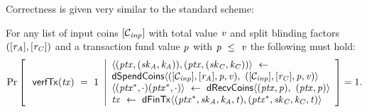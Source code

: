 Correctness is given very similar to the standard scheme:

\begin{definition}
    \label{def:ext-tx-scheme-correctness}
    For any list of input coins $[\mathcal{C}_{\mathit{inp}}]$ with total value $\mathit{v}$ and split blinding factors
    $([\mathit{r}_{\mathit{A}}], [\mathit{r}_{\mathit{C}}])$ and a transaction fund value $\mathit{p}$ with $\mathit{p} ~\leq~ \mathit{v}$ the following must hold:
    \[
        \Pr\left[
        \begin{array}{c}
            \: \mathsf{verfTx}(\mathit{tx}) ~=~ 1
        \end{array}
        \middle\vert
        \begin{array}{l}
            \langle (\mathit{ptx}, (\mathit{sk}_{\mathit{A}}, \mathit{\mathit{k}_{\mathit{A}}})), (\mathit{ptx}, (\mathit{sk}_{\mathit{C}}, \mathit{\mathit{k}_{\mathit{C}}})) \rangle ~\leftarrow~ \\
            \mathsf{dSpendCoins} \langle ([\mathcal{C}_{\mathit{inp}}],[\mathit{r}_{\mathit{A}}],\mathit{p},\mathit{v}) ,~ ([\mathcal{C}_{\mathit{inp}}],[\mathit{r}_{\mathit{C}}],\mathit{p},\mathit{v}) \rangle \\
            \langle (\mathit{ptx}^*, \cdot)(\mathit{ptx}^*, \cdot) \rangle ~\leftarrow~ \mathsf{dRecvCoins} \langle(\mathit{ptx},\mathit{p}) ,~ (\mathit{ptx},\mathit{p}) \rangle \\
            \mathit{tx} ~\leftarrow~ \mathsf{dFinTx} \langle(\mathit{ptx}^*,\mathit{sk}_{\mathit{A}},\mathit{\mathit{k}_{\mathit{A}}},\mathit{t}),(\mathit{ptx}^*,\mathit{sk}_{\mathit{C}},\mathit{\mathit{k}_{\mathit{C}}},\mathit{t})\rangle
        \end{array}
        \right]=1.
    \]
\end{definition}

